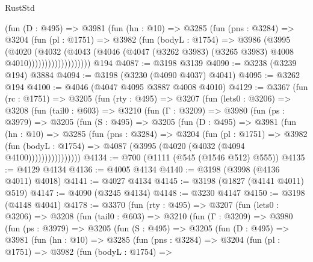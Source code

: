 \begin{lexlean}{RustStd}
\begin{coremodule}
                    (fun (D : @495) =>
                    @3981
                      (fun (hn : @10) =>
                      @3285
                        (fun (pns : @3284) =>
                        @3204
                          (fun (pl : @1751) =>
                          @3982
                            (fun (bodyL : @1754) =>
                            @3986
                              (@3995
                                (@4020
                                  (@4032
                                    (@4043
                                      (@4046
                                        (@4047
                                          (@3262 @3983)
                                          (@3265 @3983)
                                          @4008
                                          @4010)))))))))))))))))))
    @194
@4087 := @3198 @3139
@4090 := @3238 (@3239 @194) @3884
@4094 := @3198 (@3230 (@4090 @4037) @4041)
@4095 := @3262 @194
@4100 := @4046 (@4047 @4095 @3887 @4008 @4010)
@4129 := @3367
    (fun (rc : @1751) =>
    @3205
      (fun (rty : @495) =>
      @3207
        (fun (lets0 : @3206) =>
        @3208
          (fun (tail0 : @603) =>
          @3210
            (fun (Γ : @3209) =>
            @3980
              (fun (ps : @3979) =>
              @3205
                (fun (S : @495) =>
                @3205
                  (fun (D : @495) =>
                  @3981
                    (fun (hn : @10) =>
                    @3285
                      (fun (pns : @3284) =>
                      @3204
                        (fun (pl : @1751) =>
                        @3982
                          (fun (bodyL : @1754) =>
                          @4087 (@3995 (@4020 (@4032 (@4094 @4100))))))))))))))))
@4134 := @700 (@1111 (@545 (@1546 @512) @555))
@4135 := @4129 @4134
@4136 := @4005 @4134
@4140 := @3198 (@3998 (@4136 @4011) @4018)
@4141 := @4027 @4134
@4145 := @3198 (@1827 (@4141 @4011) @519)
@4147 := @4090 (@3245 @4134)
@4148 := @3230 @4147
@4150 := @3198 (@4148 @4041)
@4178 := @3370
    (fun (rty : @495) =>
    @3207
      (fun (lets0 : @3206) =>
      @3208
        (fun (tail0 : @603) =>
        @3210
          (fun (Γ : @3209) =>
          @3980
            (fun (ps : @3979) =>
            @3205
              (fun (S : @495) =>
              @3205
                (fun (D : @495) =>
                @3981
                  (fun (hn : @10) =>
                  @3285
                    (fun (pns : @3284) =>
                    @3204
                      (fun (pl : @1751) =>
                      @3982
                        (fun (bodyL : @1754) =>

\end{coremodule}
\end{lexlean}
